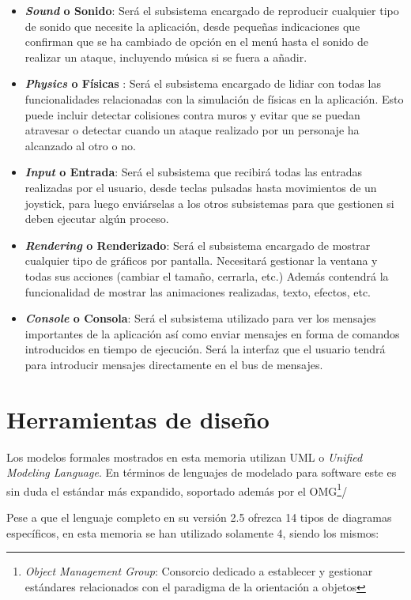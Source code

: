 \begin{itemize}
	\item \textbf{\textit{Sound} o Sonido}: Será el subsistema encargado de reproducir cualquier tipo de sonido que necesite la aplicación, desde pequeñas indicaciones que confirman que se ha cambiado de opción en el menú hasta el sonido de realizar un ataque, incluyendo música si se fuera a añadir.
	\item \textbf{\textit{Physics} o Físicas }: Será el subsistema encargado de lidiar con todas las funcionalidades relacionadas con la simulación de físicas en la aplicación. Esto puede incluir detectar colisiones contra muros y evitar que se puedan atravesar o detectar cuando un ataque realizado por un personaje ha alcanzado al otro o no.
	\item \textbf{\textit{Input} o Entrada}: Será el subsistema que recibirá todas las entradas realizadas por el usuario, desde teclas pulsadas hasta movimientos de un joystick, para luego enviárselas a los otros subsistemas para que gestionen si deben ejecutar algún proceso.
	\item \textbf{\textit{Rendering} o Renderizado}: Será el subsistema encargado de mostrar cualquier tipo de gráficos por pantalla. Necesitará gestionar la ventana y todas sus acciones (cambiar el tamaño, cerrarla, etc.) Además contendrá la funcionalidad de mostrar las animaciones realizadas, texto, efectos, etc.
	\item \textbf{\textit{Console} o Consola}: Será el subsistema utilizado para ver los mensajes importantes de la aplicación así como enviar mensajes en forma de comandos introducidos en tiempo de ejecución. Será la interfaz que el usuario tendrá para introducir mensajes directamente en el bus de mensajes.
\end{itemize}
  

\section{Herramientas de diseño}

Los modelos formales mostrados en esta memoria utilizan UML o \textit{Unified Modeling Language}. En términos de lenguajes de modelado para software este es sin duda el estándar más expandido, soportado además por el OMG\footnote{\textit{Object Management Group}: Consorcio dedicado a establecer y gestionar estándares relacionados con el paradigma de la orientación a objetos}/

\bigskip

Pese a que el lenguaje completo en su versión 2.5 ofrezca 14 tipos de diagramas específicos, en esta memoria se han utilizado solamente 4, siendo los mismos:

